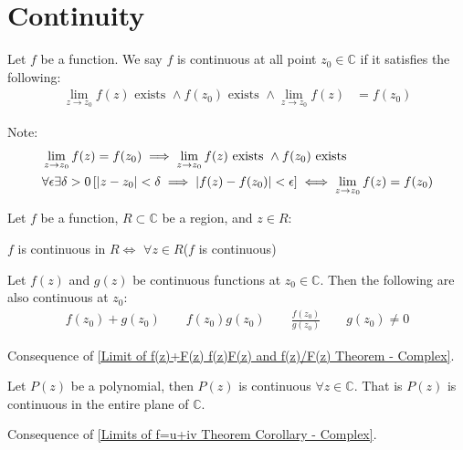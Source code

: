 \documentclass[12pt, english]{book}
\makeatletter
\renewenvironment{proof}[1][\proofname]{\par
	\pushQED{\qed}%
	\normalfont \topsep6\p@\@plus6\p@\relax
	\list{}{%
		\settowidth{\leftmargin}{\itshape\proofname:\hskip\labelsep}%
		\setlength{\labelwidth}{0pt}%
		\setlength{\itemindent}{-\leftmargin}%
		}%
	\item[\hskip\labelsep\itshape#1\@addpunct{:}]\ignorespaces
	}{\popQED\endlist\@endpefalse}
\makeatother
\begin{document}
	\section{Continuity} \label{Continuinty Section - Complex}
	\begin{definition}[Continuous] \label{Continuity! of Function}
		\label{Continuous Function Definition - Complex}
		Let $f$ be a function. We say $f$ is continuous at all point $z_0 \in \mathbb{C}$ if it satisfies the following: 
		\begin{align*}
			\lim_{z \rightarrow z_0} f(z) \text{ exists } \land f(z_0) \text{ exists } \land
			\lim_{z\rightarrow z_0} f(z) &= f(z_0)
		\end{align*} 
	\end{definition}
	Note: 
	\begin{align*}
		&\lim_{z \rightarrow z_0} f(z) = f(z_0) \implies \lim_{z \rightarrow z_0} f(z) \text{ exists } \land f(z_0) \text{ exists } \\
		&\forall \epsilon \exists \delta>0 \left[\abs{z-z_0} < \delta \implies \abs{f(z) - f(z_0)} < \epsilon \right] \iff \lim_{z \rightarrow z_0} f(z) = f(z_0)
	\end{align*}
	
	\begin{definition} \label{Continuity! at a Region}
		Let $f$ be a function, $R \subset \mathbb{C}$ be a region, and $z \in R$: 
		\begin{center}
			$f$ is continuous in $R \iff$ $\forall z \in R$($f$ is continuous)
		\end{center}
	\end{definition}
	
	\begin{theorem} 
		Let $f(z)$ and $g(z)$ be continuous functions at $z_0 \in \mathbb{C}$. Then the following are also continuous at $z_0$:
		\begin{align*}
			f(z_0) + g(z_0) \qquad f(z_0)g(z_0) \qquad \frac{f(z_0)}{g(z_0)} \qquad g(z_0) \neq 0
		\end{align*}
		\label{Continuity of f(z)+g(z) f(z)g(z) and f(z)/g(z) Theorem - Complex}
	\end{theorem}
	\begin{proof}
		Consequence of \cref{Limit of f(z)+F(z) f(z)F(z) and f(z)/F(z) Theorem - Complex}.
	\end{proof}

	\begin{corollary} 
		Let $P(z)$ be a polynomial, then $P(z)$ is continuous $\forall z \in \mathbb{C}$. That is $P(z)$ is continuous in the entire plane of $\mathbb{C}$.
		\label{Continuity of f(z)+g(z) f(z)g(z) and f(z)/g(z) Corollary - Complex}
	\end{corollary}
	\begin{proof}
		Consequence of \cref{Limits of f=u+iv Theorem Corollary - Complex}.
	\end{proof}
	
\end{document}
